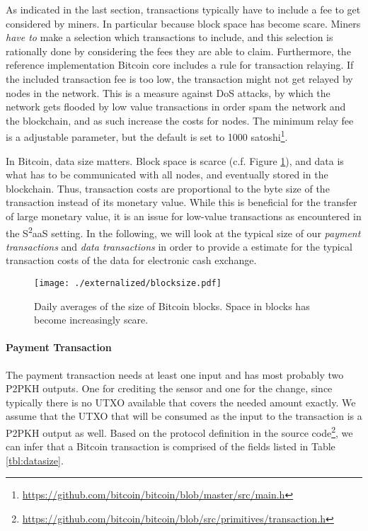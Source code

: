 As indicated in the last section, transactions typically have to include a fee to get considered by miners. In particular because block space has become scare. Miners \emph{have to} make a selection which transactions to include, and this selection is rationally done by considering the fees they are able to claim. Furthermore, the reference implementation Bitcoin core includes a rule for transaction relaying. If the included transaction fee is too low, the transaction might not get relayed by nodes in the network. This is a measure against \ac{DoS} attacks, by which the network gets flooded by low value transactions in order spam the network and the blockchain, and as such increase the costs for nodes.
The minimum relay fee is a adjustable parameter, but the default is set to 1000 satoshi\footnote{\url{https://github.com/bitcoin/bitcoin/blob/master/src/main.h}}.

In Bitcoin, data size matters. Block space is scarce (c.f. Figure \ref{fig:blocksize_btc}), and data is what has to be communicated with all nodes, and eventually stored in the blockchain. Thus, transaction costs are proportional to the byte size of the transaction instead of its monetary value. While this is beneficial for the transfer of large monetary value, it is an issue for low-value transactions as encountered in the S\textsuperscript{2}aaS setting. In the following, we will look at the typical size of our \emph{payment transactions} and \emph{data transactions} in order to provide a estimate for the typical transaction costs of the data for electronic cash exchange.

\begin{figure}
  \centering
    \centering\texttt{[image: ./externalized/blocksize.pdf]}
    \caption{Daily averages of the size of Bitcoin blocks. Space in blocks has become increasingly scare.}
    \label{fig:blocksize_btc}
\end{figure}

\paragraph{Payment Transaction}
The payment transaction needs at least one input and has most probably two \ac{P2PKH} outputs. One for crediting the sensor and one for the change, since typically there is no \ac{UTXO} available that covers the needed amount exactly.
We assume that the \ac{UTXO} that will be consumed as the input to the transaction is a \ac{P2PKH} output as well.
Based on the protocol definition in the source code\footnote{\url{https://github.com/bitcoin/bitcoin/blob/src/primitives/transaction.h}}, we can infer that a Bitcoin transaction is comprised of the fields listed in Table \ref{tbl:datasize}.

